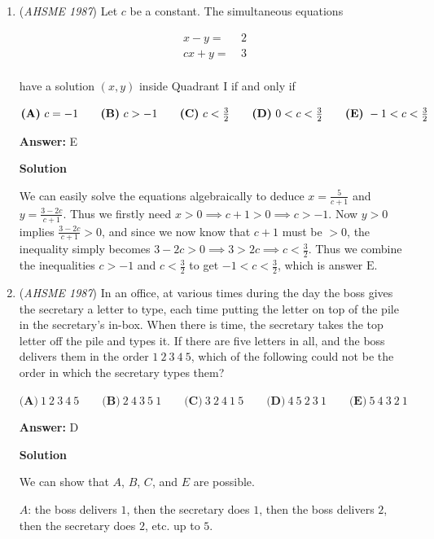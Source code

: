 \begin{enumerate}
 


	\item (\textit{AHSME 1987}) Let $c$ be a constant. The simultaneous equations

 \begin{align*}x-y = &\ 2 \\cx+y = &\ 3 \\\end{align*}

have a solution $(x, y)$ inside Quadrant I if and only if


 $\textbf{(A)}\ c=-1 \qquad \textbf{(B)}\ c>-1 \qquad \textbf{(C)}\ c<\frac{3}{2} \qquad \textbf{(D)}\ 0<c<\frac{3}{2}\\ \qquad \textbf{(E)}\ -1<c<\frac{3}{2}$

 \textbf{Answer: }E



\textbf{Solution}

We can easily solve the equations algebraically to deduce $x = \frac{5}{c+1}$ and $y = \frac{3-2c}{c+1}$. Thus we firstly need $x > 0 \implies c + 1 > 0 \implies c > -1$. Now $y > 0$ implies $\frac{3-2c}{c+1} > 0$, and since we now know that $c+1$ must be $>0$, the inequality simply becomes $3-2c > 0 \implies 3 > 2c \implies c < \frac{3}{2}$. Thus we combine the inequalities $c > -1$ and $c < \frac{3}{2}$ to get $-1 < c < \frac{3}{2}$, which is answer $\boxed{\text{E}}$.

 


	\item (\textit{AHSME 1987}) In an office, at various times during the day the boss gives the secretary a letter to type, each time putting the letter on top of the pile in the secretary's in-box. When there is time, the secretary takes the top letter off the pile and types it. If there are five letters in all, and the boss delivers them in the order $1\ 2\ 3\ 4\ 5$, which of the following could not be the order in which the secretary types them?


 $\textbf{(A)}\ 1\ 2\ 3\ 4\ 5 \qquad \textbf{(B)}\ 2\ 4\ 3\ 5\ 1 \qquad \textbf{(C)}\ 3\ 2\ 4\ 1\ 5 \qquad \textbf{(D)}\ 4\ 5\ 2\ 3\ 1 \qquad \textbf{(E)}\ 5\ 4\ 3\ 2\ 1 \qquad$

 \textbf{Answer: }D



\textbf{Solution}

We can show that $A$, $B$, $C$, and $E$ are possible.

 $A$: the boss delivers $1$, then the secretary does $1$, then the boss delivers $2$, then the secretary does $2$, etc. up to $5$.


\end{enumerate}
